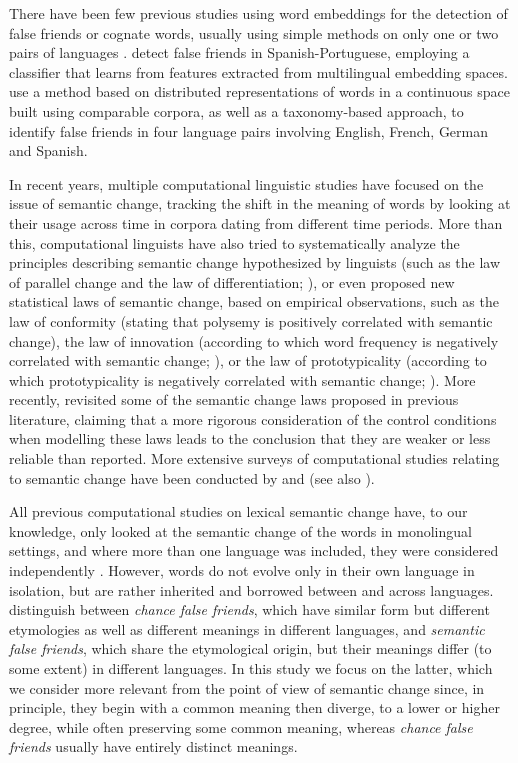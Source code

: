 \documentclass[output=paper]{langsci/langscibook}
\begin{document}
There have been few previous studies using word embeddings for the detection of false friends or cognate words, usually using simple methods on only one or two pairs of languages \citep{cognatesuban:castro2018high,cognatesuban:torres2011using}. \citet{cognatesuban:castro2018high} detect false friends in Spanish-Portuguese, employing a classifier that learns from features extracted from multilingual embedding spaces.
\citet{cognatesuban:mitkov2007methods} use a method based on distributed representations of words in a continuous space built using comparable corpora, as well as a taxonomy-based approach, to identify false friends in four language pairs involving English, French, German and Spanish.\largerpage[-1]

In recent years, multiple computational linguistic studies have focused on the issue of semantic change, tracking the shift in the meaning of words by looking at their usage across time in corpora dating from different time periods. More than this, computational linguists have also tried to systematically analyze the principles describing semantic change hypothesized by linguists (such as the law of parallel change and the law of differentiation; \citealp{xu15}), or even proposed new statistical laws of semantic change, based on empirical observations, such as the law of conformity (stating that polysemy is positively correlated with semantic change), the law of innovation (according to which word frequency is negatively correlated with semantic change; \citealp{hamilton-etal-2016-diachronic}), or the law of prototypicality (according to
which prototypicality is negatively correlated
with semantic change; \citealp{dubossarsky2015bottom}).
More recently, \citet{dubossarsky-etal-2017-outta} revisited some of the semantic change laws proposed in previous literature, claiming that a more rigorous consideration of the control conditions when modelling these laws leads to the conclusion that they are weaker or less reliable than reported. More extensive surveys of computational studies relating to semantic change have been conducted by \citet{kutuzov-etal-2018-diachronic} and \citet{tahmasebi2018survey} (see also \citealp{chapters/01}).

All previous computational studies on lexical semantic change have, to our knowledge, only looked at the semantic change of the words in monolingual settings, and where more than one language was included, they were considered independently \citep{hamilton-etal-2016-diachronic}. However, words do not evolve only in their own language in isolation, but are rather inherited and borrowed between and across languages.
\citet{cognatesuban:dominguez2002false} distinguish between \textit{chance false friends}, which have similar form but different etymologies as well as different meanings in different languages, and \textit{semantic false friends}, which share the etymological origin, but their meanings differ (to some extent) in different languages. In this study we focus on the latter, which we consider more relevant from the point of view of semantic change since, in principle, they begin with a common meaning then diverge, to a lower or higher degree, while often preserving some common meaning, whereas \textit{chance false friends} usually have entirely distinct meanings.\largerpage[-1]
\end{document}

